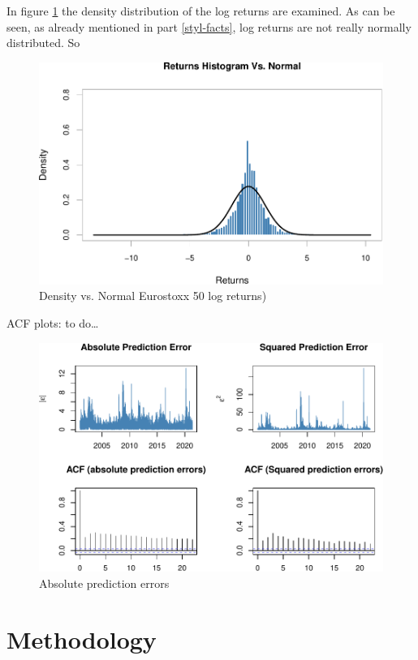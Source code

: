 \documentclass[a4paper, twoside]{templates/ociamthesis}
\begin{document}
\newpage

In figure \ref{fig:plot4} the density distribution of the log returns are examined. As can be seen, as already mentioned in part \ref{styl-facts}, log returns are not really normally distributed. So

\begin{figure}

{\centering \includegraphics[width=0.75\linewidth]{_main_files/figure-latex/plot4-1} 

}

\caption{Density vs. Normal Eurostoxx 50 log returns)}\label{fig:plot4}
\end{figure}

\newpage

ACF plots: to do\ldots{}

\begin{figure}[h]

{\centering \includegraphics[width=0.75\linewidth]{_main_files/figure-latex/acfplots-1} 

}

\caption{Absolute prediction errors}\label{fig:acfplots}
\end{figure}

\clearpage

\hypertarget{methodology}{%
\section{Methodology}\label{methodology}}
\end{document}
